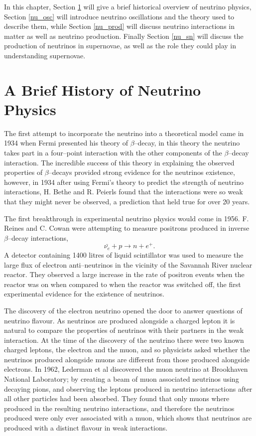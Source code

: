 In this chapter, Section \ref{nu_hist} will give a brief historical overview of 
neutrino physics, Section \ref{nu_osc} will introduce neutrino oscillations
and the theory used to describe them, while Section \ref{nu_prod} will discuss
neutrino interactions in matter as well as neutrino production. Finally Section
\ref{nu_sn} will discuss the production of neutrinos in supernovae, as well as
the role they could play in understanding supernovae.

\section{A Brief History of Neutrino Physics} \label{nu_hist}

The first attempt to incorporate the neutrino into a theoretical model came in
1934 when Fermi presented his theory of \(\beta\)--decay, in this theory the 
neutrino takes part in a four--point interaction with the other components of 
the \(\beta\)--decay interaction. The incredible success of this theory in
explaining the observed properties of \(\beta\)--decays provided strong evidence 
for the neutrinos existence, however, in 1934 after using Fermi's  theory to 
predict the strength of neutrino interactions, H. Bethe and R. Peierls found 
that the interactions were so weak that they might never be observed, a 
prediction that held true for over 20 years.

The first breakthrough in experimental neutrino physics would come in 1956. F.
Reines and C. Cowan were attempting to measure positrons produced in inverse 
\(\beta\)--decay interactions,
\begin{equation}
	\bar{\nu_e} + p \rightarrow n + e^+.
\end{equation}
A detector containing 1400 litres of liquid scintillator was used to measure the 
large flux of electron anti--neutrinos in the vicinity of the Savannah River 
nuclear reactor. They observed a large increase in the rate of positron events 
when the reactor was on when compared to when the reactor was switched off, the 
first experimental evidence for the existence of neutrinos. 

The discovery of the electron neutrino opened the door to answer questions of 
neutrino flavour. As neutrinos are produced alongside a charged lepton it is 
natural to compare the properties of neutrinos with their partners in the weak
interaction. At the time of the discovery of the neutrino there were two known
charged leptons, the electron and the muon, and so physicists asked whether the
neutrinos produced alongside muons are different from those produced alongside
electrons. In 1962, Lederman et al discovered the muon neutrino at Brookhaven
National Laboratory; by creating a beam of muon associated neutrinos using 
decaying pions, and observing the leptons produced in neutrino interactions 
after all other particles had been absorbed. They found that only muons where 
produced in the resulting neutrino interactions, and therefore the neutrinos 
produced were only ever associated with a muon, which shows that neutrinos are 
produced with a distinct flavour in weak interactions.


